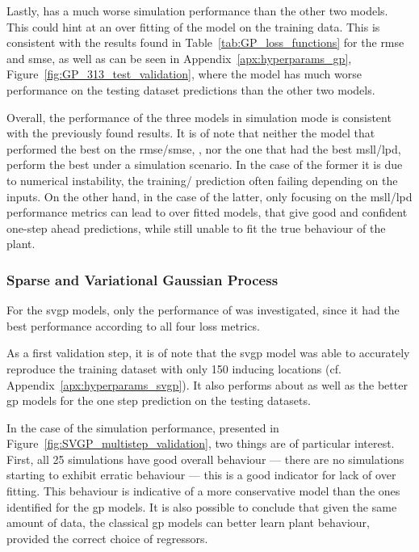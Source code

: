 Lastly,  has a much worse simulation performance than the other
two models. This could hint at an over fitting of the model on the training data.
This is consistent with the results found in Table~\ref{tab:GP_loss_functions}
for the \acrshort{rmse} and \acrshort{smse}, as well as can be seen in
Appendix~\ref{apx:hyperparams_gp}, Figure~\ref{fig:GP_313_test_validation},
where the model has much worse performance on the testing dataset predictions
than the other two models.

Overall, the performance of the three models in simulation mode is consistent
with the previously found results. It is of note that neither the model that
performed the best on the \acrshort{rmse}/\acrshort{smse}, , nor
the one that had the best \acrshort{msll}/\acrshort{lpd}, perform the best under
a simulation scenario. In the case of the former it is due to numerical
instability, the training/ prediction often failing depending on the inputs. On
the other hand, in the case of the latter, only focusing on the
\acrshort{msll}/\acrshort{lpd} performance metrics can lead to over fitted
models, that give good and confident one-step ahead predictions, while still
unable to fit the true behaviour of the plant.

\clearpage

    \subsubsection{Sparse and Variational Gaussian Process}

For the \acrshort{svgp} models, only the performance of  was
investigated, since it had the best performance according to all four loss
metrics. 

As a first validation step, it is of note that the \acrshort{svgp} model was
able to accurately reproduce the training dataset with only 150 inducing
locations (cf.  Appendix~\ref{apx:hyperparams_svgp}). It also performs about as
well as the better \acrshort{gp} models for the one step prediction on the
testing datasets.

In the case of the simulation performance, presented in
Figure~\ref{fig:SVGP_multistep_validation}, two things are of particular
interest. First, all 25 simulations have good overall behaviour --- there are no
simulations starting to exhibit erratic behaviour --- this is a good indicator
for lack of over fitting. This behaviour is indicative of a more conservative
model than the ones identified for the \acrshort{gp} models. It is also possible
to conclude that given the same amount of data, the classical \acrshort{gp}
models can better learn plant behaviour, provided the correct choice of
regressors.

